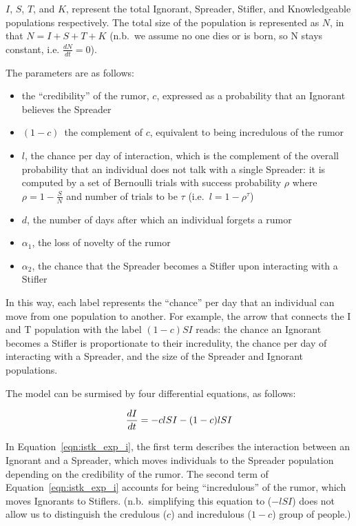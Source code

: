 $ I $, $ S $, $ T $, and $ K $, represent the total Ignorant, Spreader, Stifler, and Knowledgeable populations respectively. The total size of the population is represented as $ N $, in that $ N = I + S + T + K $ (n.b.\ we assume no one dies or is born, so N stays constant, i.e. $\frac{dN}{dt} = 0$).

The parameters are as follows:
\begin{itemize}
    \item the ``credibility'' of the rumor, $ c $, expressed as a probability that an Ignorant believes the Spreader
    \item $ (1 - c) $\, the complement of $ c $, equivalent to being incredulous of the rumor
    \item $ l $, the chance per day of interaction, which is the complement of the overall probability that an individual does not talk with a single Spreader: it is computed by a set of Bernoulli trials with success probability $ \rho $ where $ \rho = 1 - \frac{S}{N} $ and number of trials to be $ \tau $ (i.e.~$ l = 1 - \rho^\tau $)
    \item $ d $, the number of days after which an individual forgets a rumor
    \item $ \alpha_1 $, the loss of novelty of the rumor
    \item $ \alpha_2 $, the chance that the Spreader becomes a Stifler upon interacting with a Stifler
\end{itemize}

In this way, each label represents the ``chance'' per day that an individual can move from one population to another. For example, the arrow that connects the I and T population with the label $ (1-c)SI $ reads: the chance an Ignorant becomes a Stifler is proportionate to their incredulity, the chance per day of interacting with a Spreader, and the size of the Spreader and Ignorant populations.

The model can be surmised by four differential equations, as follows:

\begin{equation}
\label{eqn:istk_exp_i}
\frac{dI}{dt} = - clSI - (1-c)lSI \\
\end{equation}

\noindent In Equation~\ref{eqn:istk_exp_i}, the first term describes the interaction between an Ignorant and a Spreader, which moves individuals to the Spreader population depending on the credibility of the rumor.
 The second term of Equation~\ref{eqn:istk_exp_i} accounts for being ``incredulous'' of the rumor, which moves Ignorants to Stiflers. (n.b.\ simplifying this equation to ($-lSI$) does not allow us to distinguish the credulous ($ c $) and incredulous ($ 1 - c $) group of people.)

